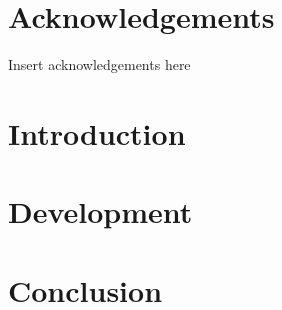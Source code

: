 \documentclass[12pt,a4paper]{article}
\begin{document}

\pagebreak

\pagebreak

\pagebreak

\begin{abstract}
\end{abstract}
\pagebreak

\tableofcontents
\newpage

\listoftables
\newpage

\listoffigures
\newpage

\section*{Acknowledgements}
Insert acknowledgements here
\subsection*{}
\newpage

\section{Introduction}



\section{Development}

\section{Conclusion}




\pagebreak

\end{document}
